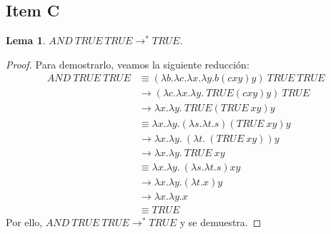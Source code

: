 \documentclass{article}
\newtheorem*{lemma*}{Lema}
\begin{document}
\subsection*{Item C}
\begin{lemma*}
  $AND\ TRUE\ TRUE \to^* TRUE$.
\end{lemma*}
\begin{proof}
  Para demostrarlo, veamos la siguiente reducción:
  \begin{equation*}
    \begin{aligned}
      AND\ TRUE\ TRUE &\equiv (\lambda b.\lambda c.\lambda x.\lambda y. b(cxy)y)\ TRUE\ TRUE \\ 
                      &\to (\lambda c.\lambda x.\lambda y.\ TRUE(cxy)y)\ TRUE \\ 
                      &\to \lambda x.\lambda y.\ TRUE(TRUE\ xy)y \\ 
                      &\equiv \lambda x.\lambda y. (\lambda s.\lambda t. s)(TRUE\ xy)y \\ 
                      &\to \lambda x.\lambda y.\ (\lambda t.\ (TRUE\ xy))y \\ 
                      &\to \lambda x.\lambda y.\ TRUE\ xy \\ 
                      &\equiv \lambda x.\lambda y.\ (\lambda s.\lambda t. s)xy \\ 
                      &\to \lambda x.\lambda y. (\lambda t. x)y \\ 
                      &\to \lambda x.\lambda y. x \\ 
                      &\equiv TRUE
    \end{aligned}
  \end{equation*}
  Por ello, $AND\ TRUE\ TRUE \to^* TRUE$ y se demuestra.
\end{proof}
\end{document}

